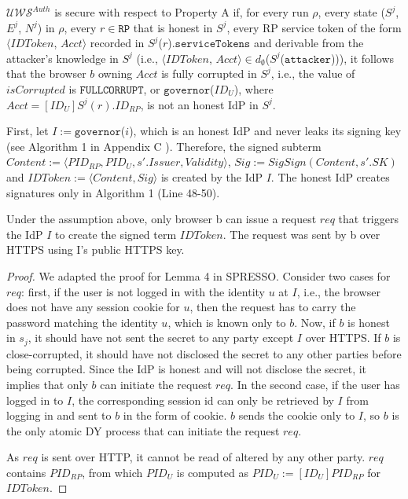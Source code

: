 
\begin{definition}
$\mathcal{U\!W\!S}^{Auth}$ is secure with respect to Property A if, for every run $\rho$, every state ($S^j$, $E^j$, $N^j$) in $\rho$, every $r \in \mathtt{RP}$ that is honest in $S^j$, every RP service token of the form $\langle IDToken$, $Acct \rangle$ recorded in $S^j$($r$).$\mathtt{serviceTokens}$ and derivable from the attacker's knowledge in $S^j$ (i.e., $\langle IDToken$, $Acct \rangle \in d_{\emptyset}$($S^j$($\mathtt{attacker}$))), it follows that the browser $b$ owning $Acct$ is fully corrupted in $S^j$, i.e., the value of $isCorrupted$ is $\mathtt{FULLCORRUPT}$, or $\mathtt{governor}$($ID_U$), where $Acct=[ID_U]S^j(r).ID_{RP}$, is not an honest IdP in $S^j$.
\end{definition}

First, let $I:=\mathtt{governor}$($i$), which is an honest IdP and never leaks its signing key (see Algorithm 1 in Appendix C%
). Therefore, the signed subterm $Content:= \langle PID_{RP}, PID_U, s'.Issuer, Validity \rangle$, $Sig:= SigSign(Content, s'.SK)$ and $IDToken:= \langle Content, Sig \rangle$ is created by the IdP $I$.  The honest IdP creates signatures only in Algorithm 1 (Line 48-50).%

\begin{lemma}
\label{lemma-user-request}
Under the assumption above, only browser b can issue a request $req$ that triggers the IdP $I$ to create the signed term $IDToken$. The request was sent by b over HTTPS using I's public HTTPS key.
\end{lemma}

\begin{proof}
We adapted the proof for Lemma 4 in SPRESSO. 
Consider two cases for $req$: first, if the user is not logged in with the identity $u$ at $I$, i.e., the browser does not have any session cookie for $u$, then the request has to carry the password matching the identity $u$, which is known only to $b$. Now, if $b$ is honest in $s_j$, it should have not sent the secret to any party except $I$ over HTTPS. If $b$ is close-corrupted, it should have not disclosed the secret to any other parties before being corrupted. Since the IdP is honest and will not disclose the secret, it implies that only $b$ can initiate the request $req$. In the second case, if the user has logged in to $I$, the corresponding session id can only be retrieved by $I$ from logging in and sent to $b$ in the form of cookie. $b$ sends the cookie only to $I$, so $b$ is the only atomic DY process that can initiate the request $req$.

As $req$ is sent over HTTP, it cannot be read of altered by any other party. $req$ contains $PID_{RP}$, from which $PID_U$ is computed as $PID_U:=[ID_U]PID_{RP}$ for $IDToken$.
\end{proof}

